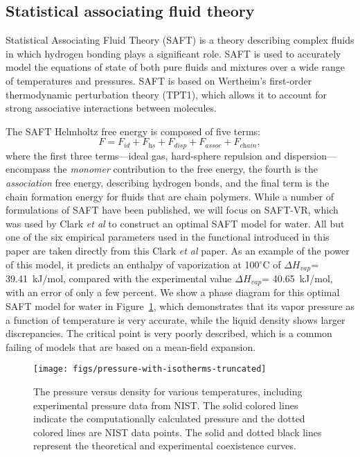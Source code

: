 \documentclass[twocolumn,amsmath,amssymb,prb]{revtex4-1}
\begin{document}
\subsection{Statistical associating fluid theory}

Statistical Associating Fluid Theory (SAFT) is a theory describing
complex fluids in which hydrogen bonding plays a significant
role\cite{chapman1989saft, muller2001molecular}.  SAFT is used to
accurately model the equations of state of both pure fluids and
mixtures over a wide range of temperatures and pressures.  SAFT is
based on Wertheim's first-order thermodynamic perturbation theory
(TPT1)\cite{wertheim1984fluidsI, wertheim1984fluidsII,
  wertheim1986fluidsIII, wertheim1986fluidsIV}, which allows it to
account for strong associative interactions between molecules.

The SAFT Helmholtz free energy is composed of five terms:
\begin{equation} \label{eq:SAFT-free-energy}
  F = F_\textit{id} + F_\textit{hs} + F_\textit{disp} +
  F_\textit{assoc} + F_\textit{chain},
\end{equation}
where the first three terms---ideal gas, hard-sphere repulsion and
dispersion---encompass the \emph{monomer} contribution
to the free energy, the fourth is the \emph{association} free energy,
describing hydrogen bonds, and the final term is the chain formation
energy for fluids that are chain polymers.  While a
number of formulations of SAFT have been published, we will focus on
SAFT-VR\cite{gil-villegas-1997-SAFT-VR}, which was used by Clark
\emph{et al} to construct an optimal SAFT model for
water\cite{clark2006developing}. All but one of the six empirical
parameters used in the functional introduced in this paper are taken
directly from this Clark \emph{et al} paper.  As an example of the
power of this model, it predicts an enthalpy of vaporization at
100$^\circ$C of $\Delta H_{vap}$= 39.41~kJ/mol, compared with the
experimental value $\Delta H_{vap}$= 40.65~kJ/mol\cite{nistwater},
with an error of only a few percent.  We show a phase diagram for
this optimal SAFT model for water in
Figure~\ref{fig:pressure-with-isotherms}, which demonstrates that its
vapor pressure as a function of temperature is very accurate, while
the liquid density shows larger discrepancies.  The critical point is
very poorly described, which is a common failing of models that are
based on a mean-field expansion.

\begin{figure}
\begin{center}
\texttt{[image: figs/pressure-with-isotherms-truncated]}
\end{center}
\caption{The pressure versus density for various temperatures, including
experimental pressure data from NIST\cite{nistwater}. The solid colored lines
indicate the computationally calculated pressure and the dotted
colored lines are NIST data points. The solid and dotted black lines
represent the theoretical and experimental coexistence curves.}
\label{fig:pressure-with-isotherms}
\end{figure}
\end{document}
